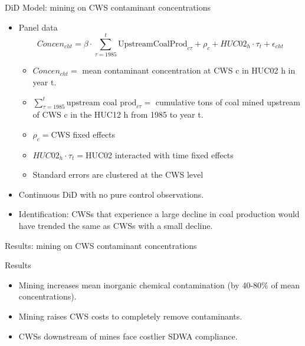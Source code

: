 \documentclass{beamer}
\begin{document}
\begin{frame}{DiD Model: mining on CWS contaminant concentrations}
\begin{itemize}
    \item Panel data
    \begin{equation}\label{eq:huc02reg}
    \textit{Concen}_{cht}= \beta\cdot\sum_{\tau=1985}^t\text{UpstreamCoalProd}_{c\tau}  + \rho_c + HUC02_h\cdot\tau_t + \epsilon_{cht}
\end{equation}

    \begin{itemize}
        \item $\textit{Concen}_{cht}=$ mean contaminant concentration at CWS c in HUC02 h in year t.
        \item $\sum_{\tau=1985}^t\text{upstream coal prod}_{c\tau}=$ cumulative tons of coal mined upstream of CWS c in the HUC12 h from 1985 to year t.
        \item $\rho_c=$CWS fixed effects
        \item $HUC02_h\cdot\tau_t=$HUC02 interacted with time fixed effects
        \item Standard errors are clustered at the CWS level
    \end{itemize}
    \item Continuous DiD with no pure control observations. 
    \item Identification: CWSs that experience a large decline in coal production would have trended the same as CWSs with a small decline.
\end{itemize}
\end{frame}

\begin{frame}{Results: mining on CWS contaminant concentrations}
    
\end{frame}

\begin{frame}{Results}
\begin{itemize}
    \item Mining increases mean inorganic chemical contamination (by 40-80\% of mean concentrations).
    \item Mining raises CWS costs to completely remove contaminants.
    \item CWSs downstream of mines face costlier SDWA compliance. 
\end{itemize}
\end{frame}
\end{document}
